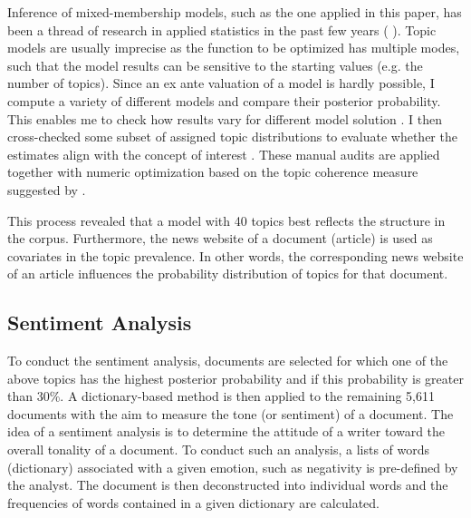 \documentclass[12pt,a4paper,notitlepage]{article}
\begin{document}
Inference of mixed-membership models, such as the one applied in this paper, has been a thread of research in applied statistics in the past few years (\citet{blei_latent_2003} \citet{erosheva_mixed-membership_2004} \citet{braun_variational_2010}). Topic models are usually imprecise as the function to be optimized has multiple modes, such that the model results can be sensitive to the starting values (e.g. the number of topics). Since an ex ante valuation of a model is hardly possible, I compute a variety of different models and compare their posterior probability. This enables me to check how results vary for different model solution \citep{roberts_navigating_2016}. I then cross-checked some subset of assigned topic distributions to evaluate whether the estimates align with the concept of interest \citep{gentzkow_text_2017}. These manual audits are applied together with numeric optimization based on the topic coherence measure suggested by \citet{mimno_optimizing_2011}. 

This process revealed that a model with 40 topics best reflects the structure in the corpus. Furthermore, the news website of a document (article) is used as covariates in the topic prevalence. In other words, the corresponding news website of an article influences the probability distribution of topics for that document. 

\subsection{Sentiment Analysis}

To conduct the sentiment analysis, documents are selected for which one of the above topics has the highest posterior probability and if this probability is greater than 30\%. A dictionary-based method is then applied to the remaining 5,611 documents with the aim to measure the tone (or sentiment) of a document. The idea of a sentiment analysis is to determine the attitude of a writer toward the overall tonality of a document. To conduct such an analysis, a lists of words (dictionary) associated with a given emotion, such as negativity is pre-defined by the analyst. The document is then deconstructed into individual words and the frequencies of words contained in a given dictionary are calculated. 
\end{document}
